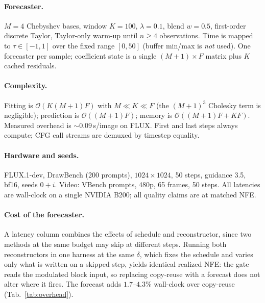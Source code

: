 \paragraph{Forecaster.} $M{=}4$ Chebyshev bases, window $K{=}100$,
$\lambda{=}0.1$, blend $w{=}0.5$, first-order discrete Taylor,
Taylor-only warm-up until $n \ge 4$ observations. Time is mapped to
$\tau \in [-1,1]$ over the fixed range $[0, 50]$ (buffer min/max is
\emph{not} used). One forecaster per sample; coefficient state is a single
$(M{+}1)\times F$ matrix plus $K$ cached residuals.

\paragraph{Complexity.} Fitting is $\mathcal{O}(K(M{+}1)F)$ with
$M \ll K \ll F$ (the $(M{+}1)^3$ Cholesky term is negligible);
prediction is $\mathcal{O}((M{+}1)F)$; memory is
$\mathcal{O}((M{+}1)F + KF)$. Measured overhead is ${\sim}0.09$\,s/image
on FLUX. First and last steps always compute; CFG call streams are
demuxed by timestep equality.

\paragraph{Hardware and seeds.} FLUX.1-dev, DrawBench (200 prompts),
$1024{\times}1024$, 50 steps, guidance 3.5, bf16, seeds $0{+}i$.
Video: VBench prompts, 480p, 65 frames, 50 steps. All latencies are
wall-clock on a single NVIDIA B200; all quality claims are at matched NFE.

\paragraph{Cost of the forecaster.} A latency column combines the
effects of schedule and reconstructor, since two methods at the same budget
may skip at different steps. Running both reconstructors in one harness
at the same $\delta$, which fixes the schedule and varies only what is
written on a skipped step, yields identical realized NFE: the gate reads
the modulated block input, so replacing copy-reuse with a forecast does
not alter where it fires. The forecast adds $1.7$--$4.3\%$ wall-clock
over copy-reuse (Tab.~\ref{tab:overhead}).

